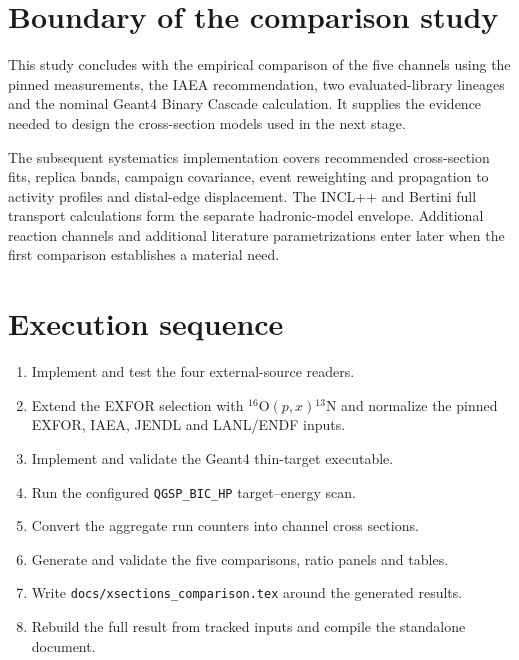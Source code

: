 \documentclass[11pt]{article}
\newcommand{\file}[1]{\texttt{#1}}
\newcommand{\Ox}[1]{{}^{#1}\mathrm{O}}
\newcommand{\Ni}[1]{{}^{#1}\mathrm{N}}
\begin{document}
\section{Boundary of the comparison study}

This study concludes with the empirical comparison of the five channels using
the pinned measurements, the IAEA recommendation, two evaluated-library
lineages and the nominal Geant4 Binary Cascade calculation.  It supplies the
evidence needed to design the cross-section models used in the next stage.

The subsequent systematics implementation covers recommended cross-section
fits, replica bands, campaign covariance, event reweighting and propagation to
activity profiles and distal-edge displacement.  The INCL++ and Bertini full
transport calculations form the separate hadronic-model envelope.  Additional
reaction channels and additional literature parametrizations enter later when
the first comparison establishes a material need.

\section{Execution sequence}

\begin{enumerate}
  \item Implement and test the four external-source readers.
  \item Extend the EXFOR selection with $\Ox{16}(p,x)\Ni{13}$ and normalize
        the pinned EXFOR, IAEA, JENDL and LANL/ENDF inputs.
  \item Implement and validate the Geant4 thin-target executable.
  \item Run the configured \file{QGSP\_BIC\_HP} target--energy scan.
  \item Convert the aggregate run counters into channel cross sections.
  \item Generate and validate the five comparisons, ratio panels and tables.
  \item Write \file{docs/xsections\_comparison.tex} around the generated
        results.
  \item Rebuild the full result from tracked inputs and compile the standalone
        document.
\end{enumerate}
\end{document}
